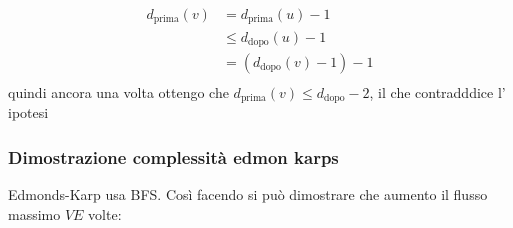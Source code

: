 \begin{itemize}
	      \begin{align*}
		      d_{\text{prima}} \left(v\right) & = d_{\text{prima}} \left(u\right) - 1                 \\
		                                      & \le d_{\text{dopo}} \left(u\right) - 1                \\
		                                      & = \left(d_{\text{dopo}} \left(v\right) - 1\right) - 1 \\
	      \end{align*}
	      quindi ancora una volta ottengo che $  d_{\text{prima}}\left(v\right) \le d_{\text{dopo}} - 2 $, il che contradddice l' ipotesi
\end{itemize}

\subsubsection{Dimostrazione complessità edmon karps}
Edmonds-Karp usa BFS. Così facendo si può dimostrare che aumento il flusso massimo $ VE $ volte:
